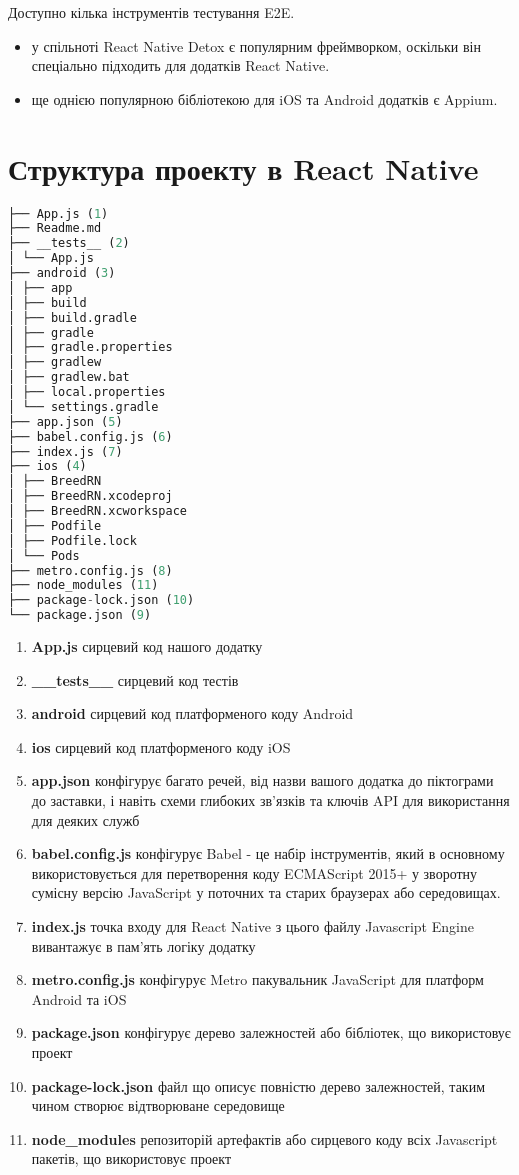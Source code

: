 Доступно кілька інструментів тестування E2E.
\begin{itemize}
    \item у спільноті React Native Detox є популярним фреймворком, оскільки він спеціально підходить для додатків React Native.\cite{detox_home_page}
    \item ще однією популярною бібліотекою для iOS та Android додатків є Appium.\cite{appium_home_page}
\end{itemize}

\section{Структура проекту в React Native}
\label{section.2.10}

\begin{lstlisting}[style=light, language=Python,label={lst:rn_app_structure},caption=React Native App Layout]
├── App.js (1)
├── Readme.md
├── __tests__ (2)
│ └── App.js
├── android (3)
│ ├── app
│ ├── build
│ ├── build.gradle
│ ├── gradle
│ ├── gradle.properties
│ ├── gradlew
│ ├── gradlew.bat
│ ├── local.properties
│ └── settings.gradle
├── app.json (5)
├── babel.config.js (6)
├── index.js (7)
├── ios (4)
│ ├── BreedRN
│ ├── BreedRN.xcodeproj
│ ├── BreedRN.xcworkspace
│ ├── Podfile
│ ├── Podfile.lock
│ └── Pods
├── metro.config.js (8)
├── node_modules (11)
├── package-lock.json (10)
└── package.json (9)
\end{lstlisting}

\begin{enumerate}
    \item \textbf{App.js} сирцевий код нашого додатку
    \item \textbf{\_\_tests\_\_} сирцевий код тестів
    \item \textbf{android} сирцевий код платформеного коду Android
    \item \textbf{ios} сирцевий код платформеного коду iOS
    \item \textbf{app.json} конфігурує багато речей, від назви вашого додатка до піктограми до заставки, і навіть схеми глибоких зв’язків та ключів API для використання для деяких служб
    \item \textbf{babel.config.js} конфігурує Babel - це набір інструментів, який в основному використовується для перетворення коду ECMAScript 2015+ у зворотну сумісну версію JavaScript у поточних та старих браузерах або середовищах.
    \item \textbf{index.js} точка входу для React Native з цього файлу Javascript Engine вивантажує в пам'ять логіку додатку
    \item \textbf{metro.config.js} конфігурує Metro пакувальник JavaScript для платформ Android та iOS
    \item \textbf{package.json} конфігурує дерево залежностей або бібліотек, що використовує проект
    \item \textbf{package-lock.json} файл що описує повністю дерево залежностей, таким чином створює відтворюване середовище
    \item \textbf{node\_modules} репозиторій артефактів або сирцевого коду всіх Javascript пакетів, що використовує проект
\end{enumerate}
